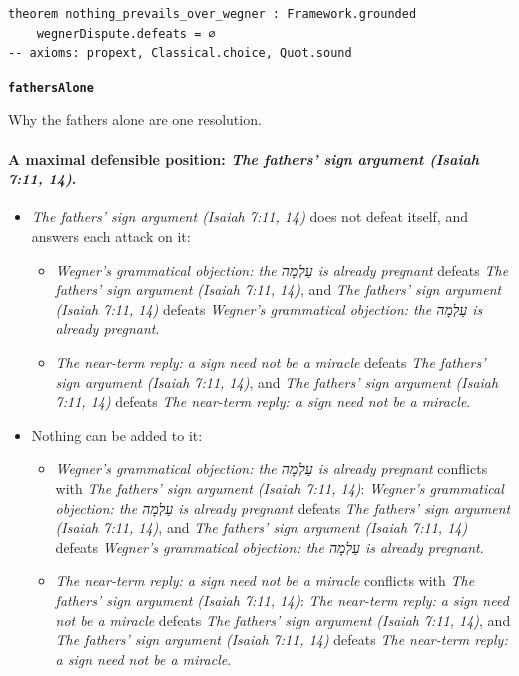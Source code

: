 \documentclass[11pt]{article}
\begin{document}
{\small\begin{verbatim}
theorem nothing_prevails_over_wegner : Framework.grounded
    wegnerDispute.defeats = ∅
-- axioms: propext, Classical.choice, Quot.sound
\end{verbatim}}
\par\medskip\noindent\textbf{\texttt{fathers\allowbreak{}Alone}}\par\nobreak\noindent
Why the fathers alone are one resolution.

\paragraph{A maximal defensible position: \emph{The fathers’ sign argument (Isaiah 7:11, 14)}.}
\begin{itemize}
\item \emph{The fathers’ sign argument (Isaiah 7:11, 14)} does not defeat itself, and answers each attack on it:
\begin{itemize}
\item \emph{Wegner’s grammatical objection: the עַלְמָה is already pregnant} defeats \emph{The fathers’ sign argument (Isaiah 7:11, 14)}, and \emph{The fathers’ sign argument (Isaiah 7:11, 14)} defeats \emph{Wegner’s grammatical objection: the עַלְמָה is already pregnant}.
\item \emph{The near-term reply: a sign need not be a miracle} defeats \emph{The fathers’ sign argument (Isaiah 7:11, 14)}, and \emph{The fathers’ sign argument (Isaiah 7:11, 14)} defeats \emph{The near-term reply: a sign need not be a miracle}.
\end{itemize}
\item Nothing can be added to it:
\begin{itemize}
\item \emph{Wegner’s grammatical objection: the עַלְמָה is already pregnant} conflicts with \emph{The fathers’ sign argument (Isaiah 7:11, 14)}: \emph{Wegner’s grammatical objection: the עַלְמָה is already pregnant} defeats \emph{The fathers’ sign argument (Isaiah 7:11, 14)}, and \emph{The fathers’ sign argument (Isaiah 7:11, 14)} defeats \emph{Wegner’s grammatical objection: the עַלְמָה is already pregnant}.
\item \emph{The near-term reply: a sign need not be a miracle} conflicts with \emph{The fathers’ sign argument (Isaiah 7:11, 14)}: \emph{The near-term reply: a sign need not be a miracle} defeats \emph{The fathers’ sign argument (Isaiah 7:11, 14)}, and \emph{The fathers’ sign argument (Isaiah 7:11, 14)} defeats \emph{The near-term reply: a sign need not be a miracle}.
\end{itemize}
\end{itemize}
\end{document}
